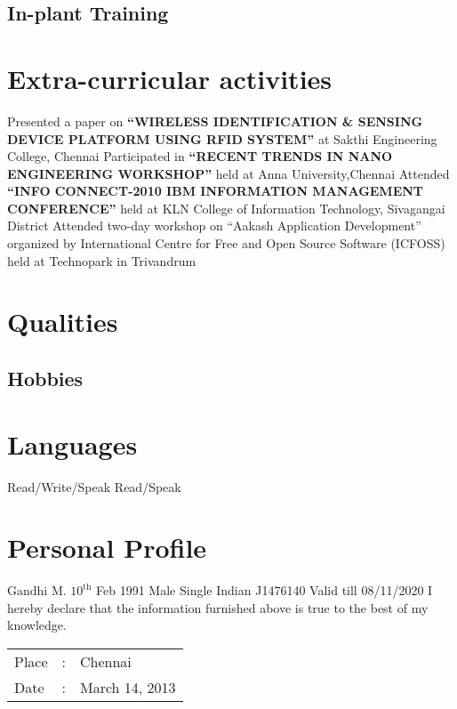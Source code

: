 \documentclass [a4paper,11pt]{moderncv}
\begin{document}
\subsection {In-plant Training}
\section {Extra-curricular activities}
\cvline {} {Presented a paper on \textbf{``WIRELESS IDENTIFICATION \& SENSING DEVICE PLATFORM USING RFID SYSTEM''} at Sakthi Engineering College, Chennai}
\cvline {} {Participated in \textbf{``RECENT TRENDS IN NANO ENGINEERING WORKSHOP''} held at Anna University,Chennai}
\cvline {} {Attended \textbf{``INFO CONNECT-2010 IBM INFORMATION MANAGEMENT CONFERENCE''} held at KLN College of Information Technology, Sivagangai District}
\cvline {} {Attended two-day workshop on ``Aakash Application Development'' organized by International Centre for Free and Open Source Software (ICFOSS) held at Technopark in Trivandrum}
\section {Qualities}
\subsection{Hobbies}

\section{Languages}
 {Read/Write/Speak}
 {Read/Speak}

\section {Personal Profile}
 {Gandhi M.}
 {$10^{\mathrm{th}}$ Feb 1991}
 {Male}
 {Single}
 {Indian}
 {J1476140 Valid till 08/11/2020}
\vspace {4pt}
I hereby declare that the information furnished above is true to the best of my knowledge.\\

\begin{tabular}{|l c l|}
Place \hspace{4pt} &:& \hspace{2pt}Chennai\\
Date\hspace{4pt}  &:& \hspace{2pt}March 14, 2013 \\
\end{tabular}
\end{document}
